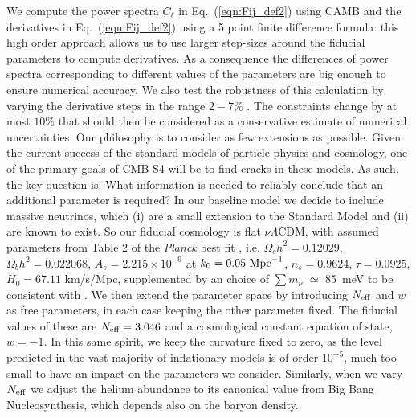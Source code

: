 \documentclass[aps,prd,reprint,superscriptaddress,nofootinbib]{revtex4-1}
\newcommand\refeq[1]{Eq.~(\ref{eqn:#1})}
\begin{document}
We compute the power spectra $C_{\ell}$ in \refeq{Fij_def2} using CAMB \cite{Howlett:2012mh,Lewis:1999bs} and
the derivatives in \refeq{Fij_def2} using a 5 point finite difference formula:
this high order approach allows us to use larger step-sizes around the fiducial parameters to compute derivatives. As a consequence the differences of power spectra corresponding to different values of the parameters are big enough to ensure numerical accuracy. We also test the robustness of this calculation by varying the derivative steps in the range $2-7\%$ . The constraints change by at most $10\%$ that should then be considered as a conservative estimate of numerical uncertainties. 
Our philosophy is to consider as few extensions as possible. Given the current success of the standard models of particle physics and cosmology, one of the primary goals of CMB-S4 will be to find cracks in these models. As such, the key question is: What information is needed to reliably conclude that an additional parameter is required? In our baseline model we decide to include massive neutrinos, which (i) are a small extension to the Standard Model and (ii) are known to exist. So our fiducial cosmology is flat $\nu \Lambda$CDM, with assumed 
parameters from Table 2 of the \textit{Planck} best fit \cite{planck-collaboration:2014g}, i.e. $\Omega_c h^2 = 0.12029$, $\Omega_b h^2 = 0.022068$, $A_s = 2.215\times10^{-9}$ at $k_0 = 0.05\ {\rm Mpc}^{-1}$, $n_s = 0.9624$, $\tau = 0.0925$, $H_0 = 67.11$ km/s/Mpc, supplemented by an choice of $\sum m_\nu$ $\simeq$ 85\ meV to be consistent with \cite{wu:2014}.  
We then extend the parameter space by introducing $N_{\rm eff}$ and $w$ as free parameters, in each case keeping the other parameter fixed.
The fiducial values of these are $N_{\rm eff}=3.046$ and a cosmological constant equation of state, $w=-1$. In this same spirit, we keep the curvature fixed to zero, as the level predicted in the vast majority of inflationary models is of order $10^{-5}$, much too small to have an impact on the parameters we consider. Similarly, when we vary $N_{\rm eff}$ we adjust the helium abundance to its canonical value from Big Bang Nucleosynthesis, which depends also on the baryon density.
\end{document}
